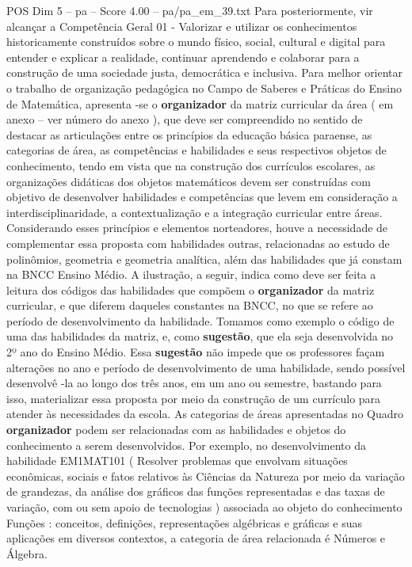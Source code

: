 \begin{textsample}{POS Dim 5 – pa – Score 4.00 – pa/pa\_em\_39.txt}
Para posteriormente, vir alcançar a Competência Geral 01 - Valorizar e utilizar os conhecimentos historicamente construídos sobre o mundo físico, social, cultural e digital para entender e explicar a realidade, continuar aprendendo e colaborar para a construção de uma sociedade justa, democrática e inclusiva.
Para melhor orientar o trabalho de organização pedagógica no Campo de Saberes e Práticas do Ensino de Matemática, apresenta -se o \textbf{organizador} da matriz curricular da área ( em anexo – ver número do anexo ), que deve ser compreendido no sentido de destacar as articulações entre os princípios da educação básica paraense, as categorias de área, as competências e habilidades e seus respectivos objetos de conhecimento, tendo em vista que na construção dos currículos escolares, as organizações didáticas dos objetos matemáticos devem ser construídas com objetivo de desenvolver habilidades e competências que levem em consideração a interdisciplinaridade, a contextualização e a integração curricular entre áreas.
Considerando esses princípios e elementos norteadores, houve a necessidade de complementar essa proposta com habilidades outras, relacionadas ao estudo de polinômios, geometria e geometria analítica, além das habilidades que já constam na BNCC Ensino Médio.
A ilustração, a seguir, indica como deve ser feita a leitura dos códigos das habilidades que compõem o \textbf{organizador} da matriz curricular, e que diferem daqueles constantes na BNCC, no que se refere ao período de desenvolvimento da habilidade.
Tomamos como exemplo o código de uma das habilidades da matriz, e, como \textbf{sugestão}, que ela seja desenvolvida no 2º ano do Ensino Médio.
Essa \textbf{sugestão} não impede que os professores façam alterações no ano e período de desenvolvimento de uma habilidade, sendo possível desenvolvê -la ao longo dos três anos, em um ano ou semestre, bastando para isso, materializar essa proposta por meio da construção de um currículo para atender às necessidades da escola.
As categorias de áreas apresentadas no Quadro \textbf{organizador} podem ser relacionadas com as habilidades e objetos do conhecimento a serem desenvolvidos.
Por exemplo, no desenvolvimento da habilidade EM1MAT101 ( Resolver problemas que envolvam situações econômicas, sociais e fatos relativos às Ciências da Natureza por meio da variação de grandezas, da análise dos gráficos das funções representadas e das taxas de variação, com ou sem apoio de tecnologias ) associada ao objeto do conhecimento Funções : conceitos, definições, representações algébricas e gráficas e suas aplicações em diversos contextos, a categoria de área relacionada é Números e Álgebra.

\end{textsample}
